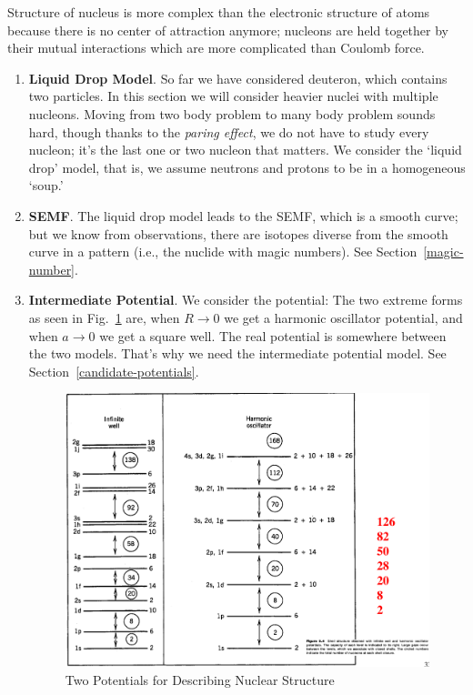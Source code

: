 \documentclass{school-22.101-notes}
\begin{document}
Structure of nucleus is more complex than the electronic structure of atoms because there is no center of attraction anymore; nucleons are held together by their mutual interactions which are more complicated than Coulomb force. 


\begin{enumerate}
\item \textbf{Liquid Drop Model}. So far we have considered deuteron, which contains two particles. In this section we will consider heavier nuclei with multiple nucleons. Moving from two body problem to many body problem sounds hard, though thanks to the \textit{paring effect}, we do not have to study every nucleon; it's the last one or two nucleon that matters. We consider the `liquid drop' model, that is, we assume neutrons and protons to be in a homogeneous `soup.' 

\item \textbf{SEMF}. The liquid drop model leads to the SEMF, which is a smooth curve; but we know from observations, there are isotopes diverse from the smooth curve in a pattern (i.e., the nuclide with magic numbers). See Section~\ref{magic-number}.


\item \textbf{Intermediate Potential}. We consider the potential: The two extreme forms as seen in Fig.~\ref{potential-candidates} are, when $R \to 0$ we get a harmonic oscillator potential, and when $a \to 0$ we get a square well. The real potential is somewhere between the two models. That's why we need the intermediate potential model. See Section~\ref{candidate-potentials}.
\begin{figure}[ht]
  \centering
  \includegraphics[width=5in]{images/ns/potential-candidates.png}
  \caption{Two Potentials for Describing Nuclear Structure} \label{potential-candidates}
\end{figure}


\end{enumerate}
\end{document}
